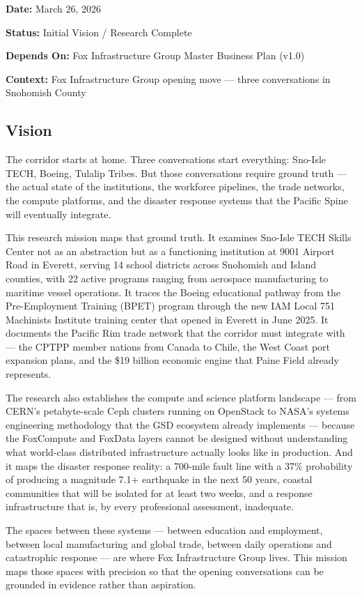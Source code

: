 \documentclass[11pt,letterpaper]{article}
\newcommand{\metafield}[2]{\textbf{\sffamily #1} #2\par}
\begin{document}
\metafield{Date:}{March 26, 2026}
\metafield{Status:}{Initial Vision / Research Complete}
\metafield{Depends On:}{Fox Infrastructure Group Master Business Plan (v1.0)}
\metafield{Context:}{Fox Infrastructure Group opening move --- three conversations in Snohomish County}

\subsection{Vision}

The corridor starts at home. Three conversations start everything: Sno-Isle TECH, Boeing, Tulalip Tribes. But those conversations require ground truth --- the actual state of the institutions, the workforce pipelines, the trade networks, the compute platforms, and the disaster response systems that the Pacific Spine will eventually integrate.

This research mission maps that ground truth. It examines Sno-Isle TECH Skills Center not as an abstraction but as a functioning institution at 9001 Airport Road in Everett, serving 14 school districts across Snohomish and Island counties, with 22 active programs ranging from aerospace manufacturing to maritime vessel operations. It traces the Boeing educational pathway from the Pre-Employment Training (BPET) program through the new IAM Local 751 Machinists Institute training center that opened in Everett in June 2025. It documents the Pacific Rim trade network that the corridor must integrate with --- the CPTPP member nations from Canada to Chile, the West Coast port expansion plans, and the \$19 billion economic engine that Paine Field already represents.

The research also establishes the compute and science platform landscape --- from CERN's petabyte-scale Ceph clusters running on OpenStack to NASA's systems engineering methodology that the GSD ecosystem already implements --- because the FoxCompute and FoxData layers cannot be designed without understanding what world-class distributed infrastructure actually looks like in production. And it maps the disaster response reality: a 700-mile fault line with a 37\% probability of producing a magnitude 7.1+ earthquake in the next 50 years, coastal communities that will be isolated for at least two weeks, and a response infrastructure that is, by every professional assessment, inadequate.

The spaces between these systems --- between education and employment, between local manufacturing and global trade, between daily operations and catastrophic response --- are where Fox Infrastructure Group lives. This mission maps those spaces with precision so that the opening conversations can be grounded in evidence rather than aspiration.
\end{document}
